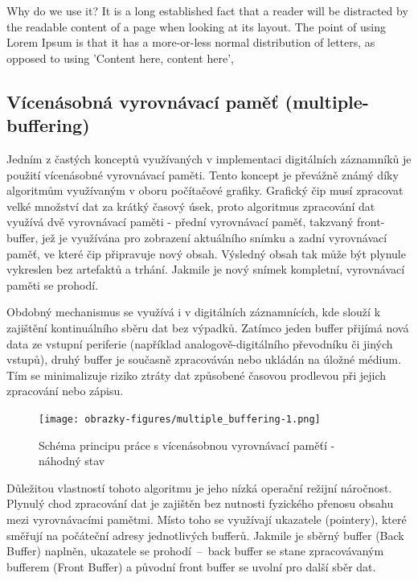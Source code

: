 Why do we use it?
It is a long established fact that a reader will be distracted by the readable content of a page when looking at its layout. The point of using Lorem Ipsum is that it has 
a more-or-less normal distribution of letters, as opposed to using 'Content here, content here', 

\subsection{Vícenásobná vyrovnávací paměť (multiple-buffering)}
Jedním z častých konceptů využívaných v implementaci digitálních záznamníků je použití vícenásobné vyrovnávací paměti. Tento koncept je převážně známý díky algoritmům 
využívaným v oboru počítačové grafiky. Grafický čip musí zpracovat velké množství dat za krátký časový úsek, proto algoritmus zpracování dat využívá dvě vyrovnávací 
paměti - přední vyrovnávací paměť, takzvaný front-buffer, jež je využívána pro zobrazení aktuálního snímku 
a zadní vyrovnávací paměť, ve které čip připravuje nový obsah. Výsledný obsah tak může být plynule vykreslen bez artefaktů a trhání. Jakmile je nový snímek kompletní, 
vyrovnávací paměti se prohodí. \cite{double_buffering_model}

Obdobný mechanismus se využívá i v digitálních záznamnících, kde slouží k zajištění kontinuálního sběru dat bez výpadků. Zatímco jeden buffer přijímá nová data ze vstupní 
periferie (například analogově-digitálního převodníku či jiných vstupů), druhý buffer je současně zpracováván nebo ukládán na úložné médium. Tím se minimalizuje riziko 
ztráty dat způsobené časovou prodlevou při jejich zpracování nebo zápisu.

\begin{figure}[h]
    \centering
    \texttt{[image: obrazky-figures/multiple\_buffering-1.png]}
    
    \caption{Schéma principu práce s vícenásobnou vyrovnávací paměťí - náhodný stav}
    \label{fig:multiple-buffering-1}
\end{figure}

Důležitou vlastností tohoto algoritmu je jeho nízká operační režijní náročnost. Plynulý chod zpracování dat je zajištěn bez nutnosti fyzického přenosu obsahu mezi 
vyrovnávacími pamětmi. Místo toho se využívají ukazatele (pointery), které směřují na počáteční adresy jednotlivých bufferů. Jakmile je sběrný buffer (Back Buffer) 
naplněn, ukazatele se prohodí~–~back buffer se stane zpracovávaným bufferem (Front Buffer) a původní front buffer se uvolní pro další sběr dat.

